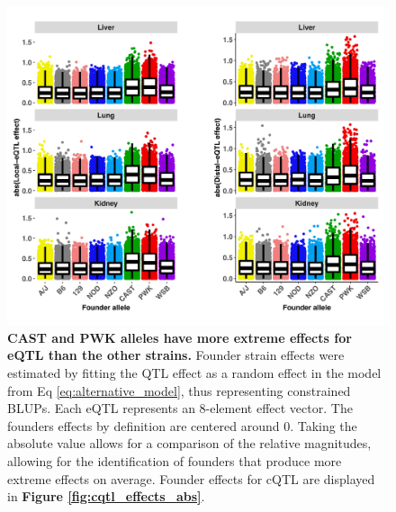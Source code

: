 \documentclass[9pt,twocolumn,twoside]{gsajnl}
\begin{document}
\begin{figure}[hp]
\renewcommand{\familydefault}{\sfdefault}\normalfont
\centering
\includegraphics[width=\textwidth, trim={0in 0in 0in 0in}, clip]{figs/all_eqtl_effects_abs.pdf}
\caption{\textbf{CAST and PWK alleles have more extreme effects for eQTL than the other strains.} Founder strain effects were estimated by fitting the QTL effect as a random effect in the model from Eq \ref{eq:alternative_model}, thus representing constrained BLUPs. Each eQTL represents an 8-element effect vector. The founders effects by definition are centered around 0. Taking the absolute value allows for a comparison of the relative magnitudes, allowing for the identification of founders that produce more extreme effects on average. Founder effects for cQTL are displayed in \textbf{Figure \ref{fig:cqtl_effects_abs}}.
\label{fig:eqtl_effects_abs}}
\end{figure}
\end{document}
